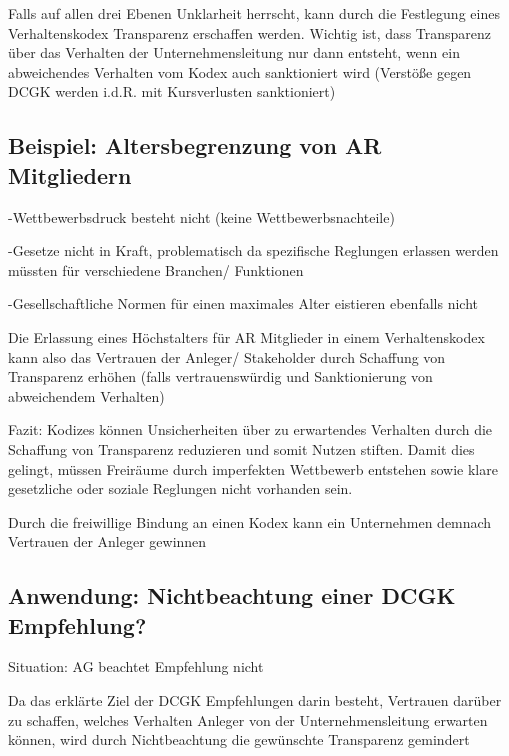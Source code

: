 \documentclass[
]{article}
\begin{document}
Falls auf allen drei Ebenen Unklarheit herrscht, kann durch die
Festlegung eines Verhaltenskodex Transparenz erschaffen werden. Wichtig
ist, dass Transparenz über das Verhalten der Unternehmensleitung nur
dann entsteht, wenn ein abweichendes Verhalten vom Kodex auch
sanktioniert wird (Verstöße gegen DCGK werden i.d.R. mit Kursverlusten
sanktioniert)

\hypertarget{beispiel-altersbegrenzung-von-ar-mitgliedern}{%
\subsection{Beispiel: Altersbegrenzung von AR
Mitgliedern}\label{beispiel-altersbegrenzung-von-ar-mitgliedern}}

-Wettbewerbsdruck besteht nicht (keine Wettbewerbsnachteile)

-Gesetze nicht in Kraft, problematisch da spezifische Reglungen erlassen
werden müssten für verschiedene Branchen/ Funktionen

-Gesellschaftliche Normen für einen maximales Alter eistieren ebenfalls
nicht

Die Erlassung eines Höchstalters für AR Mitglieder in einem
Verhaltenskodex kann also das Vertrauen der Anleger/ Stakeholder durch
Schaffung von Transparenz erhöhen (falls vertrauenswürdig und
Sanktionierung von abweichendem Verhalten)

Fazit: Kodizes können Unsicherheiten über zu erwartendes Verhalten durch
die Schaffung von Transparenz reduzieren und somit Nutzen stiften. Damit
dies gelingt, müssen Freiräume durch imperfekten Wettbewerb entstehen
sowie klare gesetzliche oder soziale Reglungen nicht vorhanden sein.

Durch die freiwillige Bindung an einen Kodex kann ein Unternehmen
demnach Vertrauen der Anleger gewinnen

\hypertarget{anwendung-nichtbeachtung-einer-dcgk-empfehlung}{%
\subsection{Anwendung: Nichtbeachtung einer DCGK
Empfehlung?}\label{anwendung-nichtbeachtung-einer-dcgk-empfehlung}}

Situation: AG beachtet Empfehlung nicht

Da das erklärte Ziel der DCGK Empfehlungen darin besteht, Vertrauen
darüber zu schaffen, welches Verhalten Anleger von der
Unternehmensleitung erwarten können, wird durch Nichtbeachtung die
gewünschte Transparenz gemindert
\end{document}
